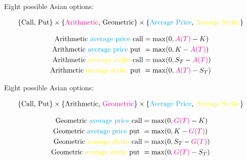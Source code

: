 \begin{frame}[fragile,t]
	\begin{center}
		Eight possible Asian options:

		\begin{align*}
			\left\{\text{Call, Put}\right\}
			\times \left\{\text{\textcolor{magenta}{Arithmetic}, Geometric}\right\}
			\times \left\{\text{\textcolor{cyan}{Average Price}, \textcolor{yellow}{Average Strike}}\right\}
		\end{align*}
	\end{center}
	\vfill
	\mySeparateLine
	\vfill
	\begin{align*}
		\text{Arithmetic \textcolor{cyan}{average price}  call}    & = \max(0, \textcolor{magenta}{A(T)}-K)     \\
		\text{Arithmetic \textcolor{cyan}{average price}  put }    & = \max(0, K-\textcolor{magenta}{A(T)})     \\
		\text{Arithmetic \textcolor{yellow}{average strike} call}  & = \max(0, S_T - \textcolor{magenta}{A(T)}) \\
		\text{Arithmetic \textcolor{yellow}{average strike} put } & = \max(0, \textcolor{magenta}{A(T)}-S_T)
	\end{align*}
\end{frame}
\begin{frame}[fragile,t]
	\begin{center}
		Eight possible Asian options:

		\begin{align*}
			\left\{\text{Call, Put}\right\}
			\times \left\{\text{Arithmetic, \textcolor{magenta}{Geometric}}\right\}
			\times \left\{\text{\textcolor{cyan}{Average Price}, \textcolor{yellow}{Average Strike}}\right\}
		\end{align*}
	\end{center}
	\vfill
	\mySeparateLine
	\vfill
	\begin{align*}
		\text{Geometric \textcolor{cyan}{average price} call}    & = \max(0, \textcolor{magenta}{G(T)}-K)     \\
		\text{Geometric \textcolor{cyan}{average price}  put }   & = \max(0, K-\textcolor{magenta}{G(T)})     \\
		\text{Geometric \textcolor{yellow}{average strike} call} & = \max(0, S_T - \textcolor{magenta}{G(T)}) \\
		\text{Geometric \textcolor{yellow}{average strike} put } & = \max(0, \textcolor{magenta}{G(T)}-S_T)
	\end{align*}
\end{frame}
